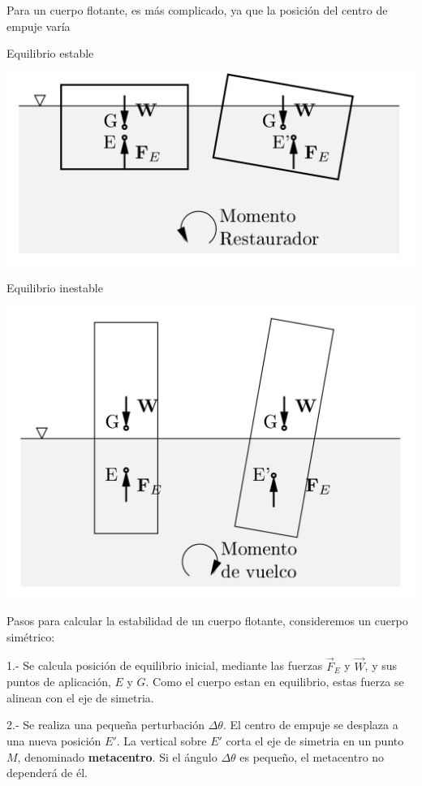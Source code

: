 

Para un cuerpo flotante, es más complicado, ya que la posición del centro de empuje varía


Equilibrio estable 
\begin{center}
	\includegraphics[width=0.7\linewidth]{TeX_files/chapter02-Hidrostatica/estabilidad2}
\end{center}



Equilibrio inestable
\begin{center}
	\includegraphics[width=0.7\linewidth]{TeX_files/chapter02-Hidrostatica/estabilidad3}
\end{center}


Pasos para calcular la estabilidad de un cuerpo flotante, consideremos un cuerpo simétrico:

1.- Se calcula posición de equilibrio inicial, mediante las fuerzas $\vec F_E$ y $\vec W$, y sus puntos de aplicación, $E$ y $G$. Como el cuerpo estan en equilibrio, estas fuerza se alinean con el eje de simetria.

2.- Se realiza una peque\~na perturbación $\Delta \theta$. El centro de empuje se desplaza a una nueva posición $E'$. La vertical sobre $E'$ corta el eje de simetria en un punto $M$, denominado \textbf{metacentro}. Si el ángulo $\Delta \theta$ es peque\~no, el metacentro no dependerá de él.

